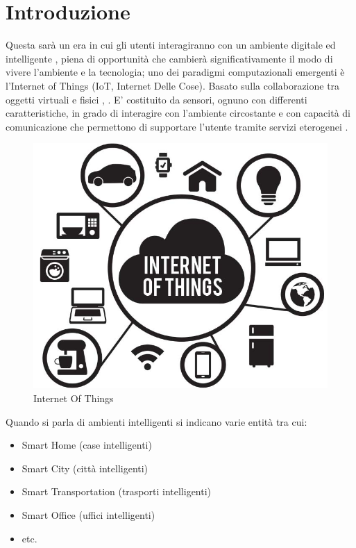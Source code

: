 \chapter{Introduzione}
\label{cap1}

Questa sarà un era in cui gli utenti interagiranno con un ambiente digitale ed intelligente \cite{Fortino2014}, piena di opportunità \cite{GUBBI20131645} che cambierà significativamente il modo di vivere l'ambiente e la tecnologia; uno dei paradigmi computazionali emergenti è l’Internet of Things (IoT, Internet Delle Cose). Basato sulla collaborazione tra oggetti virtuali e fisici \cite{fortino2014internet}, \cite{fortino2014integration}. 
E' costituito da sensori, ognuno con differenti caratteristiche, in grado di interagire con l’ambiente circostante e con capacità di comunicazione che permettono di supportare l’utente tramite servizi eterogenei \cite{8000145}.
\begin{figure}[h]
	\centering
	\includegraphics[width=0.7\linewidth]{imgs/Internet-of-Things-IoTgraphic}
	\caption[Internet Of Things]{Internet Of Things}
	\label{fig:internet-of-things-iotgraphic}
\end{figure}

Quando si parla di ambienti intelligenti si indicano varie entità tra cui:
\begin{itemize}
	\item Smart Home (case intelligenti)
	\item Smart City (città intelligenti)
	\item Smart Transportation (trasporti intelligenti)
	\item Smart Office (uffici intelligenti)
	\item etc.
\end{itemize}

